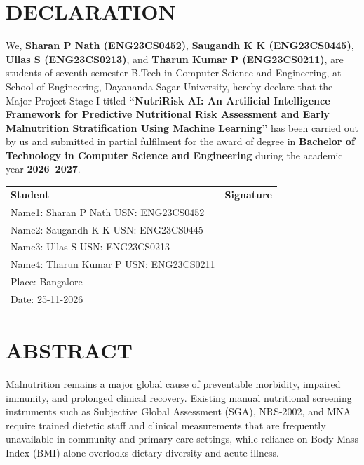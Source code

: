 \documentclass[12pt,a4paper]{report}
\begin{document}
\chapter*{DECLARATION}
\thispagestyle{plain}

\noindent We, \textbf{Sharan P Nath (ENG23CS0452)}, \textbf{Saugandh K K (ENG23CS0445)}, \textbf{Ullas S (ENG23CS0213)}, and \textbf{Tharun Kumar P (ENG23CS0211)}, are students of seventh semester B.Tech in Computer Science and Engineering, at School of Engineering, Dayananda Sagar University, hereby declare that the Major Project Stage-I titled \textbf{``NutriRisk AI: An Artificial Intelligence Framework for Predictive Nutritional Risk Assessment and Early Malnutrition Stratification Using Machine Learning''} has been carried out by us and submitted in partial fulfilment for the award of degree in \textbf{Bachelor of Technology in Computer Science and Engineering} during the academic year \textbf{2026--2027}.

\vspace{26pt}
\noindent
\begin{tabular}{@{}p{}p{}@{}}
\textbf{Student} & \textbf{Signature} \\[14pt]
Name1: Sharan P Nath \quad USN: ENG23CS0452 & \\[12pt]
Name2: Saugandh K K \quad USN: ENG23CS0445 & \\[12pt]
Name3: Ullas S \quad USN: ENG23CS0213 & \\[12pt]
Name4: Tharun Kumar P \quad USN: ENG23CS0211 & \\[20pt]
Place: Bangalore & \\
Date: 25-11-2026 &
\end{tabular}
\newpage

\chapter*{ABSTRACT}

Malnutrition remains a major global cause of preventable morbidity, impaired immunity, and prolonged clinical recovery. Existing manual nutritional screening instruments such as Subjective Global Assessment (SGA), NRS-2002, and MNA require trained dietetic staff and clinical measurements that are frequently unavailable in community and primary-care settings, while reliance on Body Mass Index (BMI) alone overlooks dietary diversity and acute illness.
\end{document}
